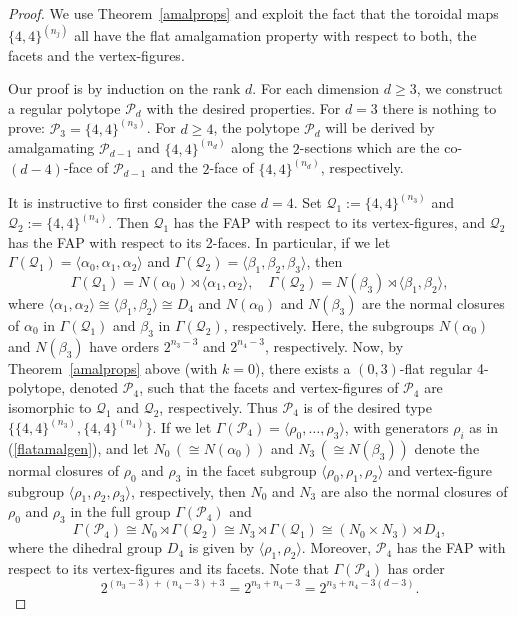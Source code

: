 \documentclass[10pt,a4paper]{amsart}
\theoremstyle{definition}
\begin{document}
\begin{proof}
We use Theorem~\ref{amalprops} and exploit the fact that the toroidal maps $\{4,4\}^{(n_j)}$ all have the flat amalgamation property with respect to both, the facets and the vertex-figures. 

Our proof is by induction on the rank $d$. For each dimension $d\geq 3$, we construct a regular polytope ${\mathcal P}_d$ with the desired properties. For $d=3$ there is nothing to prove: ${\mathcal P}_{3}=\{4,4\}^{(n_3)}$. For $d\geq 4$, the polytope ${\mathcal P}_{d}$ will be derived by amalgamating ${\mathcal P}_{d-1}$ and $\{4,4\}^{(n_d)}$ along the $2$-sections which are the co-$(d-4)$-face of ${\mathcal P}_{d-1}$ and the $2$-face of $\{4,4\}^{(n_d)}$, respectively. 

It is instructive to first consider the case $d=4$. Set ${\mathcal Q}_1:=\{4,4\}^{(n_3)}$ and 
${\mathcal Q}_2:=\{4,4\}^{(n_4)}$. Then ${\mathcal Q}_1$ has the FAP with respect to its vertex-figures, and ${\mathcal Q}_2$ has the FAP with respect to its 2-faces. In particular, if we let $\Gamma(\mathcal{Q}_1)=\langle\alpha_0,\alpha_1,\alpha_2\rangle$ and $\Gamma(\mathcal{Q}_2)=\langle\beta_1,\beta_2,\beta_3\rangle$, then 
\[\Gamma(\mathcal{Q}_1)=N(\alpha_0)\rtimes\langle\alpha_1,\alpha_2\rangle,\quad
\Gamma(\mathcal{Q}_2)=N(\beta_3)\rtimes\langle\beta_1,\beta_2\rangle,\]
where $\langle\alpha_1,\alpha_2\rangle\cong\langle\beta_1,\beta_2\rangle\cong D_4$ and $N(\alpha_0)$ and $N(\beta_3)$ are the normal closures of $\alpha_0$ in 
$\Gamma(\mathcal{Q}_1)$ and $\beta_3$ in $\Gamma(\mathcal{Q}_2)$, respectively. Here, the subgroups $N(\alpha_0)$ and $N(\beta_3)$ have orders $2^{n_{3}-3}$ and $2^{n_{4}-3}$, respectively. Now, by Theorem~\ref{amalprops} above (with $k=0$), there exists a $(0,3)$-flat regular 4-polytope, denoted $\mathcal{P}_4$,  such that the facets and vertex-figures of ${\mathcal P}_4$ are isomorphic to ${\mathcal Q}_1$ and ${\mathcal Q}_2$, respectively. Thus ${\mathcal P}_4$ is of the desired type $\{\{4,4\}^{(n_3)},\{4,4\}^{(n_4)}\}$. If we let $\Gamma({\mathcal P}_4)=\langle\rho_0,\ldots,\rho_3\rangle$, with generators $\rho_i$ as in (\ref{flatamalgen}), and let $N_{0}\,(\cong N(\alpha_0))$ and $N_{3}\,(\cong N(\beta_3))$ denote the normal closures of $\rho_0$ and $\rho_3$ in the facet subgroup $\langle\rho_0,\rho_1,\rho_2\rangle$ and vertex-figure subgroup $\langle\rho_1,\rho_2,\rho_3\rangle$, respectively, then $N_{0}$ and $N_{3}$ are also the normal closures of $\rho_0$ and $\rho_3$ in the full group $\Gamma({\mathcal P}_4)$ and
\[\Gamma({\mathcal P}_4)
\cong N_0\rtimes\Gamma(\mathcal{Q}_2)
\cong N_3\rtimes\Gamma(\mathcal{Q}_1)
\cong (N_0\times N_3)\rtimes D_4 ,\]
where the dihedral group $D_4$ is given by $\langle\rho_1,\rho_2\rangle$. Moreover, ${\mathcal P}_4$ has the FAP with respect to its vertex-figures and its facets. Note that $\Gamma({\mathcal P}_4)$ has order
\[2^{(n_{3}-3)+(n_{4}-3)+3}=2^{n_3+n_4-3}=2^{n_3+n_4-3(d-3)}.\]


\end{proof}
\end{document}
